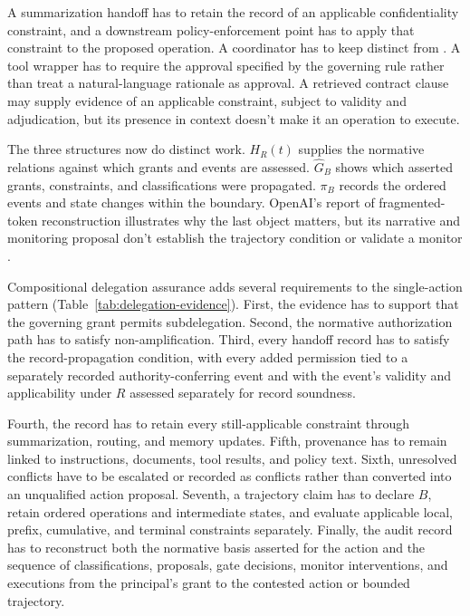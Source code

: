 A summarization handoff has to retain the record of an applicable confidentiality constraint, and a downstream policy-enforcement point has to apply that constraint to the proposed operation. A coordinator has to keep  distinct from . A tool wrapper has to require the approval specified by the governing rule rather than treat a natural-language rationale as approval. A retrieved contract clause may supply evidence of an applicable constraint, subject to validity and adjudication, but its presence in context doesn't make it an operation to execute.

The three structures now do distinct work. \(H_R(t)\) supplies the normative relations against which grants and events are assessed. \(\widehat G_B\) shows which asserted grants, constraints, and classifications were propagated. \(\pi_B\) records the ordered events and state changes within the boundary. OpenAI's report of fragmented-token reconstruction illustrates why the last object matters, but its narrative and monitoring proposal don't establish the trajectory condition or validate a monitor \parencite{openai2026longHorizonSafety}.

Compositional delegation assurance adds several requirements to the single-action pattern (Table~\ref{tab:delegation-evidence}). First, the evidence has to support that the governing grant permits subdelegation. Second, the normative authorization path has to satisfy non-amplification. Third, every handoff record has to satisfy the record-propagation condition, with every added permission tied to a separately recorded authority-conferring event and with the event's validity and applicability under \(R\) assessed separately for record soundness.

Fourth, the record has to retain every still-applicable constraint through summarization, routing, and memory updates. Fifth, provenance has to remain linked to instructions, documents, tool results, and policy text. Sixth, unresolved conflicts have to be escalated or recorded as conflicts rather than converted into an unqualified action proposal. Seventh, a trajectory claim has to declare \(B\), retain ordered operations and intermediate states, and evaluate applicable local, prefix, cumulative, and terminal constraints separately. Finally, the audit record has to reconstruct both the normative basis asserted for the action and the sequence of classifications, proposals, gate decisions, monitor interventions, and executions from the principal's grant to the contested action or bounded trajectory.

